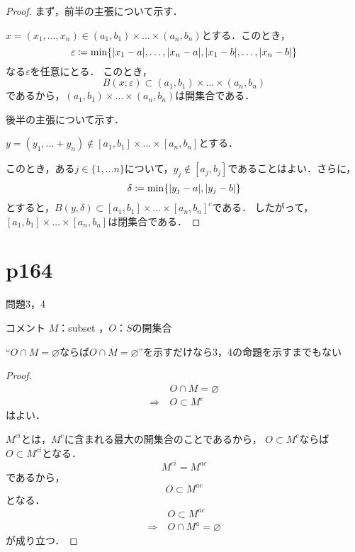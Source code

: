 \documentclass[dvipdfmx,uplatex,11pt]{jsarticle}
\begin{document}
\begin{leftbar}
    \begin{proof}
        まず，前半の主張について示す．

        $x=(x_1  , \dots , x_n)\in　(a_1 , b_1) \times \dots \times (a_n , b_n)$とする．このとき，
        \[
            \varepsilon \coloneqq \min \{ \abs{x_1-a},\dots,\abs{x_n -a},\abs{x_1-b},\dots, \abs{x_n-b} \}
        \]
        なる$\varepsilon$を任意にとる．
        このとき，
        \[
            B(x;\varepsilon) \subset (a_1 , b_1) \times \dots \times (a_n , b_n)
        \]
        であるから，$(a_1 , b_1) \times \dots \times (a_n , b_n)$は開集合である．

        後半の主張について示す．
        
        $ y = (y_1 , \dots + y_n ) \notin [a_1 , b_1] \times \dots \times [a_n , b_n]$とする．

        このとき，ある$j \in \{1,\dots n\}$について，$y_j \notin [a_j , b_j]$であることはよい．さらに，
        \[
            \delta \coloneqq \min  \{ \abs{y_j -a},\abs{y_j - b}\}
        \]
        とすると，$ B(y , \delta ) \subset {[a_1,b_1] \times \dots \times [a_n , b_n]}^c$である．
        したがって，$[a_1,b_1] \times \dots \times [a_n , b_n]$は閉集合である．
    \end{proof}
    \end{leftbar}

\section{p164}
問題3，4

\begin{itembox}[c]{コメント}
    $M$：subset ，$O$：$S$の開集合

    ``$O \cap M = \varnothing$ならば$O \cap \overline{M} = \varnothing$''を示すだけなら3，4の命題を示すまでもない
\end{itembox}

\begin{leftbar}
    \begin{proof}
        \begin{align*}
            &O \cap M = \varnothing \\
            \Rightarrow~ & O \subset M^e 
        \end{align*}
        はよい．

        $M^{ci}$とは，$M^c$に含まれる最大の開集合のことであるから，
        $O \subset M^c$ならば$O \subset M^{ci}$となる．
        \[
            M^{ci} = M^{ac}
        \]
        であるから，
        \[
            O \subset M^{ac}
        \]
        となる．
        \begin{align*}
            &O \subset M^{ac} \\
            \Rightarrow ~ & O \cap M^a = \varnothing
        \end{align*}
        が成り立つ．
    \end{proof}
\end{leftbar}
\end{document}
